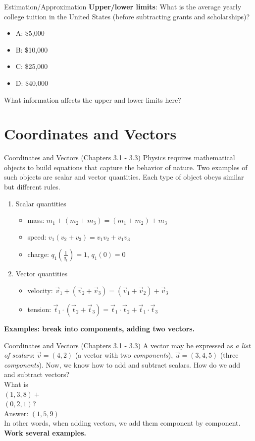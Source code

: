 \documentclass{beamer}
\begin{document}
\begin{frame}{Estimation/Approximation}
\textbf{Upper/lower limits}: What is the average yearly college tuition in the United States (before subtracting grants and scholarships)?
\begin{itemize}
\item A: \$5,000
\item B: \$10,000
\item C: \$25,000
\item D: \$40,000
\end{itemize}
What information affects the \alert{upper} and \alert{lower} limits here?
\end{frame}

\section{Coordinates and Vectors}

\begin{frame}{Coordinates and Vectors (Chapters 3.1 - 3.3)}
Physics requires \alert{mathematical objects} to build equations that capture the behavior of nature.  Two examples of such objects are \alert{scalar} and \alert{vector} quantities.  Each type of object obeys similar but different rules.
\begin{enumerate}
\item Scalar quantities
\begin{itemize}
\item mass: $m_1+(m_2+m_3) = (m_1+m_2)+m_3$
\item speed: $v_1(v_2+v_3) = v_1v_2+v_1v_3$
\item charge: $q_1 \left(\frac{1}{q_1}\right) = 1$, $q_1(0) = 0$
\end{itemize}
\item Vector quantities
\begin{itemize}
\item velocity: $\vec{v}_1 + (\vec{v}_2+\vec{v}_3) = (\vec{v}_1 + \vec{v}_2)+\vec{v}_3$
\item tension: $\vec{t}_1 \cdot (\vec{t}_2 + \vec{t}_3) = \vec{t}_1 \cdot \vec{t}_2 + \vec{t}_1 \cdot \vec{t}_3$
\end{itemize}
\end{enumerate}
\textbf{Examples: break into components, adding two vectors.}
\end{frame}

\begin{frame}{Coordinates and Vectors (Chapters 3.1 - 3.3)}
A vector may be expressed as \textit{a list of scalars}: $\vec{v} = (4,2)$ (a vector with two \textit{components}), $\vec{u} = (3,4,5)$ (three \textit{components}).  Now, we know how to add and subtract scalars.  How do we add and subtract vectors? \\
\vspace{0.5cm}
What is\\
$(1,3,8)+$\\ $(0,2,1)$? \\
Answer: $(1,5,9)$ \\
\vspace{0.5cm}
In other words, when adding vectors, we add them component by component. \textbf{Work several examples.}
\end{frame}
\end{document}
